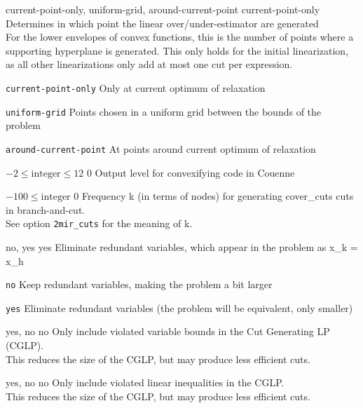 %
{current-point-only, uniform-grid, around-current-point}%
{current-point-only}%
{Determines in which point the linear over/under-estimator are generated\\
For the lower envelopes of convex functions, this is the number of points where a supporting hyperplane is generated. This only holds for the initial linearization, as all other linearizations only add at most one cut per expression.}%
{\begin{list}{}{
\setlength{\parsep}{0em}
\setlength{\leftmargin}{5ex}
\setlength{\labelwidth}{2ex}
\setlength{\itemindent}{0ex}
\setlength{\topsep}{0pt}}
\item[\texttt{current-point-only}] Only at current optimum of relaxation
\item[\texttt{uniform-grid}] Points chosen in a uniform grid between the bounds of the problem
\item[\texttt{around-current-point}] At points around current optimum of relaxation
\end{list}
}

%
{$-2\leq\textrm{integer}\leq12$}%
{$0$}%
{Output level for convexifying code in Couenne}%
{}

%
{$-100\leq\textrm{integer}$}%
{$0$}%
{Frequency k (in terms of nodes) for generating cover\_cuts cuts in branch-and-cut.\\
See option \texttt{2mir\_cuts} for the meaning of k.}%
{}

%
{no, yes}%
{yes}%
{Eliminate redundant variables, which appear in the problem as x\_k = x\_h}%
{\begin{list}{}{
\setlength{\parsep}{0em}
\setlength{\leftmargin}{5ex}
\setlength{\labelwidth}{2ex}
\setlength{\itemindent}{0ex}
\setlength{\topsep}{0pt}}
\item[\texttt{no}] Keep redundant variables, making the problem a bit larger
\item[\texttt{yes}] Eliminate redundant variables (the problem will be equivalent, only smaller)
\end{list}
}

%
{yes, no}%
{no}%
{Only include violated variable bounds in the Cut Generating LP (CGLP).\\
This reduces the size of the CGLP, but may produce less efficient cuts.}%
{}

%
{yes, no}%
{no}%
{Only include violated linear inequalities in the CGLP.\\
This reduces the size of the CGLP, but may produce less efficient cuts.}%
{}

